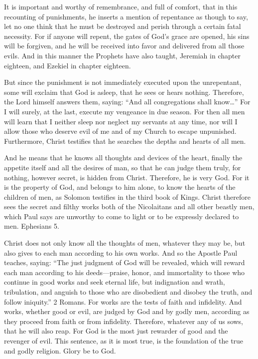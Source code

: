 It is important and worthy of remembrance, and full of comfort, that in this recounting of punishments, he inserts a mention of repentance as though to say, let no one think that he must be destroyed and perish through a certain fatal necessity. For if anyone will repent, the gates of God’s grace are opened, his sins will be forgiven, and he will be received into favor and delivered from all those evils. And in this manner the Prophets have also taught, Jeremiah in chapter eighteen, and Ezekiel in chapter eighteen.

But since the punishment is not immediately executed upon the unrepentant, some will exclaim that God is asleep, that he sees or hears nothing. Therefore, the Lord himself answers them, saying: “And all congregations shall know…” For I will surely, at the last, execute my vengeance in due season. For then all men will learn that I neither sleep nor neglect my servants at any time, nor will I allow those who deserve evil of me and of my Church to escape unpunished. Furthermore, Christ testifies that he searches the depths and hearts of all men.

And he means that he knows all thoughts and devices of the heart, finally the appetite itself and all the desires of man, so that he can judge them truly, for nothing, however secret, is hidden from Christ. Therefore, he is very God. For it is the property of God, and belongs to him alone, to know the hearts of the children of men, as Solomon testifies in the third book of Kings. Christ therefore sees the secret and filthy works both of the Nicolaitans and all other beastly men, which Paul says are unworthy to come to light or to be expressly declared to men. Ephesians 5.

Christ does not only know all the thoughts of men, whatever they may be, but also gives to each man according to his own works. And so the Apostle Paul teaches, saying: “The just judgment of God will be revealed, which will reward each man according to his deeds—praise, honor, and immortality to those who continue in good works and seek eternal life, but indignation and wrath, tribulation, and anguish to those who are disobedient and disobey the truth, and follow iniquity.” 2 Romans. For works are the tests of faith and infidelity. And works, whether good or evil, are judged by God and by godly men, according as they proceed from faith or from infidelity. Therefore, whatever any of us sows, that he will also reap. For God is the most just rewarder of good and the revenger of evil. This sentence, as it is most true, is the foundation of the true and godly religion. Glory be to God.

